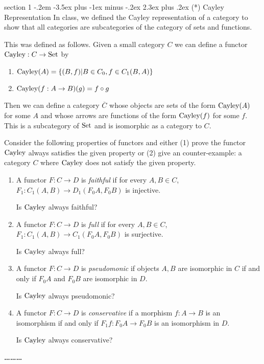 \documentclass[12pt]{article}
\makeatletter
\newenvironment{problem}{\@startsection
       {section}
       {1}
       {-.2em}
       {-3.5ex plus -1ex minus -.2ex}
       {2.3ex plus .2ex}
       {\pagebreak[3]%
       \large\bf\noindent{Problem }
       }
       }
       {%
       \begin{center}\large\bf \ldots\ldots\ldots\end{center}}
\makeatother
\begin{document}
\begin{problem}{(*) Cayley Representation}
  In class, we defined the Cayley representation of a category to
  show that all categories are subcategories of the category of sets
  and functions.

  This was defined as follows. Given a small category $C$ we can
  define a functor $\textrm{Cayley} : C \to \textrm{Set}$ by
  \begin{enumerate}
  \item $\textrm{Cayley}(A) = \{ (B, f) | B \in C_0, f \in C_1(B, A) \}$
  \item $\textrm{Cayley}(f : A \to B)(g) = f \circ g$ 
  \end{enumerate}

  Then we can define a category $\overline C$ whose objects are sets
  of the form $\textrm{Cayley}(A)$ for some $A$ and whose arrows are
  functions of the form $\textrm{Cayley}(f)$ for some $f$. This is a
  subcategory of $\textrm{Set}$ and is isomorphic as a category to
  $C$.

  
  Consider the following properties of functors and either (1) prove
  the functor $\textrm{Cayley}$ always satisfies the given property or
  (2) give an counter-example: a category $C$ where $\textrm{Cayley}$
  does not satisfy the given property.

  \begin{enumerate}
  \item A functor $F: C \to D$ is \emph{faithful} if for every $A, B
    \in C$, $F_1 : C_1(A,B) \to D_1(F_0 A, F_0 B)$ is injective.

    Is $\textrm{Cayley}$ always faithful?
  \item A functor $F: C \to D$ is \emph{full} if for every $A, B \in
    C$, $F_1 : C_1(A,B) \to C_1(F_0 A, F_0 B)$ is surjective.

    Is $\textrm{Cayley}$ always full?

  \item A functor $F : C \to D$ is \emph{pseudomonic} if objects $A,
    B$ are isomorphic in $C$ if and only if $F_0 A$ and $F_0 B$ are
    isomorphic in $D$.

    Is $\textrm{Cayley}$ always pseudomonic?

  \item A functor $F : C \to D$ is \emph{conservative} if a morphism
    $f : A \to B$ is an isomorphism if and only if $F_1 f : F_0 A \to
    F_0 B$ is an isomorphism in $D$.

    Is $\textrm{Cayley}$ always conservative?
  \end{enumerate}
\end{problem}
\end{document}
